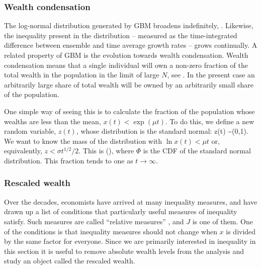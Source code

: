 
\subsubsection{Wealth condensation}
The log-normal distribution generated by GBM broadens indefinitely, . Likewise, the inequality present in the distribution -- measured as the time-integrated difference between ensemble and time average growth rates -- grows continually. A related property of GBM is the evolution towards wealth condensation. Wealth condensation means that a single individual will own a non-zero fraction of the total wealth in the population in the limit of large $N$, see \eg \cite{BouchaudMezard2000}. In the present case an arbitrarily large share of total wealth will be owned by an arbitrarily small share of the population.

One simple way of seeing this is to calculate the fraction of the population whose wealths are less than the mean, \ie $x(t)<\exp(\mu t)$. To do this, we define a new random variable, $z(t)$, whose distribution is the standard normal:
\be
z(t) \equiv {} \sim {}(0,1).
\ee
We want to know the mass of the distribution with $\ln x(t)<\mu t$ or, equivalently, $z<\sigma t^{1/2}/2$. This is
\be
\Phi\left(\right),
\ee
where $\Phi$ is the CDF of the standard normal distribution. This fraction tends to one as $t\to\infty$.


\subsubsection{Rescaled wealth}
Over the decades, economists have arrived at many inequality measures, and have drawn 
up a list of conditions that particularly useful measures of inequality satisfy. Such measures
are called ``relative measures'' \cite[Appendix 4]{Sen1997}, and $J$ is one of them. One of the conditions is that inequality measures
should not change when $x$ is divided by the same factor for everyone. Since we are primarily 
interested in inequality in this section it is useful to remove absolute wealth levels from the
analysis and study an object called the rescaled wealth.


